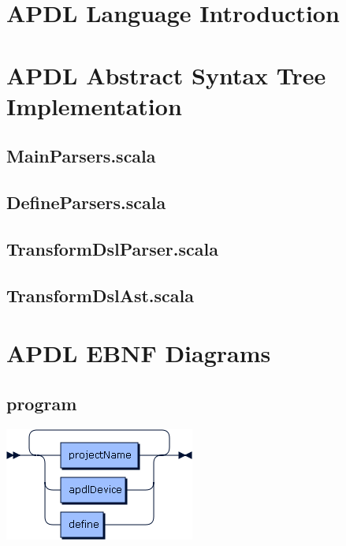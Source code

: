 \begin{appendices}
  
\chapter{APDL Language Introduction}
\label{app:tf-getting-started}



\chapter{APDL Abstract Syntax Tree Implementation}
\label{app:apdl_ast_implementation}

\section*{MainParsers.scala}

\section*{DefineParsers.scala}

\section*{TransformDslParser.scala}

\section*{TransformDslAst.scala}

\chapter{APDL EBNF Diagrams}
\label{app:apdl_ebnf_diagramm}

\section*{program}\includegraphics[scale=0.7]{img/ebnf_grammar/program}

\end{appendices}

